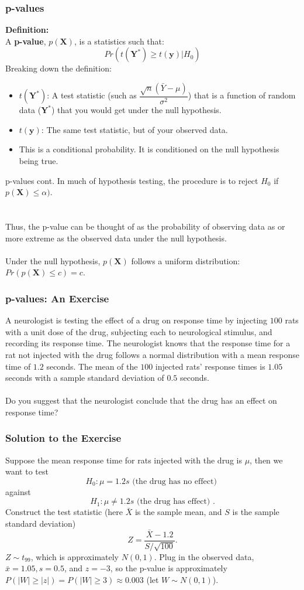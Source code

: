 \documentclass{beamer}
\begin{document}
\begin{frame}
\frametitle{p-values}
\textbf{Definition:} \\
A \textbf{p-value}, $p(\textbf{X})$, is a statistics such that:
$$
Pr(t(\textbf{Y}^*) \geq t(\textbf{y}) | H_0)
$$
Breaking down the definition:
\begin{itemize}
    \item $t(\textbf{Y}^*)$: A test statistic (such as $\dfrac{\sqrt{n}(\bar{Y} - \mu)}{\sigma^2}$) that is a function of random data ($\textbf{Y}^*$) that you would get under the null hypothesis.
    \item $t(\textbf{y})$: The same test statistic, but of your observed data.
    \item This is a conditional probability. It is conditioned on the null hypothesis being true.
\end{itemize}
\end{frame}

\begin{frame}{p-values cont.}
In much of hypothesis testing, the procedure is to reject $H_0$ if $p(\textbf{X}) \leq \alpha)$. \\
\\~\\
Thus, the p-value can be thought of as the probability of observing data as or more extreme as the observed data under the null hypothesis.
\\~\\
Under the null hypothesis, $p(\textbf{X})$ follows a uniform distribution: $Pr(p(\textbf{X}) \leq c) = c$.
\end{frame}

\begin{frame}
\frametitle{p-values: An Exercise}
A neurologist is testing the effect of a drug on response time by injecting $100$ rats with a unit dose of the drug, subjecting each to neurological stimulus, and recording its response time. The neurologist knows that the response time for a rat not injected with the drug follows a normal distribution with a mean response time of $1.2$ seconds. The mean of the $100$ injected rats' response times is $1.05$ seconds with a sample standard deviation of $0.5$ seconds. 
\\~\\
Do you suggest that the neurologist conclude that the drug has an effect on response time?
\end{frame}

\begin{frame}
\frametitle{Solution to the Exercise}
Suppose the mean response time for rats injected with the drug is $\mu$, then we want to test
$$
H_0: \mu = 1.2s \text{ (the drug has no effect) }
$$
against
$$
H_1: \mu \neq 1.2s \text{ (the drug has effect) }.
$$
Construct the test statistic (here $\bar{X}$ is the sample mean, and $S$ is the sample standard deviation)
$$
Z = \frac{\bar{X} - 1.2}{S/\sqrt{100}}.
$$
$Z \sim t_{99}$, which is approximately $N(0,1)$. Plug in the observed data, $\bar{x} = 1.05, s = 0.5$, and $z=-3$, so the p-value is approximately $P(\vert W \vert \geq \vert z \vert) = P(\vert W \vert \geq 3) \approx 0.003$ (let $W \sim N(0,1)$).%
\end{frame}
\end{document}
